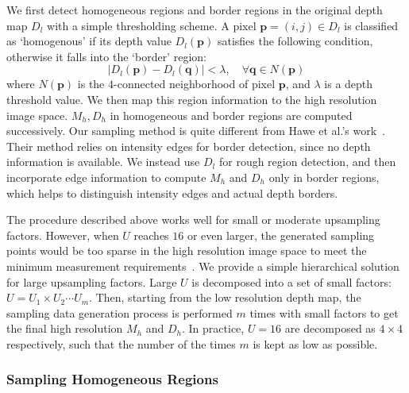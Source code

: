 \documentclass[preprint,10pt,5p,times,twocolumn]{elsarticle}
\begin{document}
We first detect homogeneous regions and border regions in the original depth map $D_{l}$ with a simple thresholding scheme. A pixel $\mathbf{p}=(i,j)\in D_{l}$ is classified as `homogenous' if its depth value $D_{l}(\mathbf{p})$ satisfies the following condition, otherwise it falls into the `border' region:
\begin{equation}
\label{eq:regiondetection}
|D_{l}(\mathbf{p})-D_{l}(\mathbf{q})|<\lambda , \quad \forall \mathbf{q}\in N(\mathbf{p})
\end{equation}
where $N(\mathbf{p})$ is the $4$-connected neighborhood of pixel $\mathbf{p}$, and $\lambda$ is a depth threshold value. We then map this region information to the high resolution image space. $M_{h},D_{h}$ in homogeneous and border regions are computed successively. Our sampling method is quite different from Hawe et al.'s work~\cite{HKD11}. Their method relies on intensity edges for border detection, since no depth information is available. We instead use $D_{l}$ for rough region detection, and then incorporate edge information to compute $M_{h}$ and $D_{h}$ only in border regions, which helps to distinguish intensity edges and actual depth borders.

The procedure described above works well for small or moderate upsampling factors. However, when $U$ reaches $16$ or even larger, the generated sampling points would be too sparse in the high resolution image space to meet the minimum measurement requirements~\cite{CR07}. We provide a simple hierarchical solution for large upsampling factors. Large $U$ is decomposed into a set of small factors: $U=U_{1}\times U_{2}\cdots U_{m}$. Then, starting from the low resolution depth map, the sampling data generation process is performed $m$ times with small factors to get the final high resolution $M_{h}$ and $D_{h}$. In practice, $U = 16$ are decomposed as $4\times4$ respectively, such that the number of the times $m$ is kept as low as possible.

\subsubsection{Sampling Homogeneous Regions}
\label{chap:samplingdata1}
\end{document}
